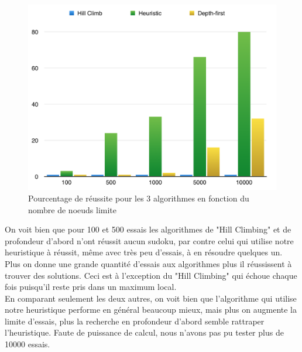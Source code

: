 \documentclass[a4paper,10pt]{article}
\begin{document}
\begin{figure}[H]
	\includegraphics[width=12cm]{images/comparaison.png} 
	\centering
	\caption{Pourcentage de réussite pour les 3 algorithmes en fonction du nombre de noeuds limite}
	\label{fig:comp}
\end{figure}

On voit bien que pour 100 et 500 essais les algorithmes de "Hill Climbing" et de profondeur d'abord n'ont réussit aucun sudoku, par contre celui qui utilise notre heuristique à réussit, même avec très peu d'essais, à en résoudre quelques un. Plus on donne une grande quantité d'essais aux algorithmes plus il réussissent à trouver des solutions. Ceci est à l'exception du "Hill Climbing" qui échoue chaque fois puisqu'il reste pris dans un maximum local.\\

En comparant seulement les deux autres, on voit bien que l'algorithme qui utilise notre heuristique performe en général beaucoup mieux, mais plus on augmente la limite d'essais, plus la recherche en profondeur d'abord semble rattraper l'heuristique. Faute de puissance de calcul, nous n'avons pas pu tester plus de 10000 essais. 
\end{document}
